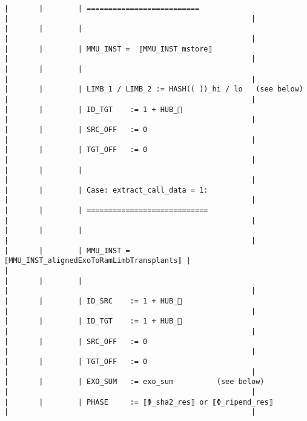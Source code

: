 \documentclass[varwidth=\maxdimen,margin=0.5cm,multi={verbatim}]{standalone}
\begin{document}
\begin{verbatim}
|       |        | ==========================                            |                                                        |
|       |        |                                                       |                                                        |
|       |        | MMU_INST =  ⟦MMU_INST_mstore⟧                         |                                                        |
|       |        |                                                       |                                                        |
|       |        | LIMB_1 / LIMB_2 := HASH(( ))_hi / lo   (see below)    |                                                        |
|       |        | ID_TGT    := 1 + HUB_                                |                                                        |
|       |        | SRC_OFF   := 0                                        |                                                        |
|       |        | TGT_OFF   := 0                                        |                                                        |
|       |        |                                                       |                                                        |
|       |        | Case: extract_call_data = 1:                          |                                                        |
|       |        | ============================                          |                                                        |
|       |        |                                                       |                                                        |
|       |        | MMU_INST =  ⟦MMU_INST_alignedExoToRamLimbTransplants⟧ |                                                        |
|       |        |                                                       |                                                        |
|       |        | ID_SRC    := 1 + HUB_                                |                                                        |
|       |        | ID_TGT    := 1 + HUB_                                |                                                        |
|       |        | SRC_OFF   := 0                                        |                                                        |
|       |        | TGT_OFF   := 0                                        |                                                        |
|       |        | EXO_SUM   := exo_sum          (see below)             |                                                        |
|       |        | PHASE     := ⟦Φ_sha2_res⟧ or ⟦Φ_ripemd_res⟧           |                                                        |

\end{verbatim}
\end{document}
